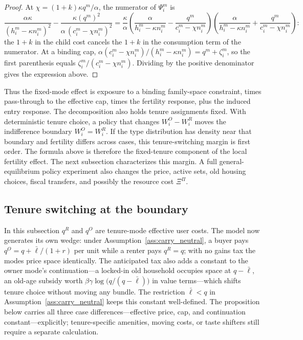 \documentclass[11pt]{article}
\newcommand{\1}{\mathbf 1}
\begin{document}
\begin{proof}
At $\chi=(1+k)\kappa q^m/\alpha$, the numerator of $\Psi_i^m$ is
\[
\frac{\alpha\kappa}{(h_i^m-\kappa n_i^m)^2}
-
\frac{\kappa (q^m)^2}{\alpha\,(c_i^m-\chi n_i^m)^2}
=
\frac{\kappa}{\alpha}
\left(\frac{\alpha}{h_i^m-\kappa n_i^m}-\frac{q^m}{c_i^m-\chi n_i^m}\right)
\left(\frac{\alpha}{h_i^m-\kappa n_i^m}+\frac{q^m}{c_i^m-\chi n_i^m}\right):
\]
the $1+k$ in the child cost cancels the $1+k$ in the consumption term of the numerator. At a binding cap, $\alpha(c_i^m-\chi n_i^m)/(h_i^m-\kappa n_i^m)=q^m+\zeta_i^m$, so the first parenthesis equals $\zeta_i^m/(c_i^m-\chi n_i^m)$. Dividing by the positive denominator gives the expression above.
\end{proof}

Thus the fixed-mode effect is exposure to a binding family-space constraint, times pass-through to the effective cap, times the fertility response, plus the induced entry response. The decomposition also holds tenure assignments fixed. With deterministic tenure choice, a policy that changes $W_i^O-W_i^R$ moves the indifference boundary $W_i^O=W_i^R$. If the type distribution has density near that boundary and fertility differs across cases, this tenure-switching margin is first order. The formula above is therefore the fixed-tenure component of the local fertility effect. The next subsection characterizes this margin. A full general-equilibrium policy experiment also changes the price, active sets, old housing choices, fiscal transfers, and possibly the resource cost $\Xi^\Pi$.

\subsection{Tenure switching at the boundary}

In this subsection $q^R$ and $q^O$ are tenure-mode effective user costs. The model now generates its own wedge: under Assumption~\ref{ass:carry_neutral}, a buyer pays $q^O=q+\bar\ell/(1+r)$ per unit while a renter pays $q^R=q$; with no gains tax the modes price space identically. The anticipated tax also adds a constant to the owner mode's continuation---a locked-in old household occupies space at $q-\bar\ell$, an old-age subsidy worth $\beta\gamma\log\big(q/(q-\bar\ell)\big)$ in value terms---which shifts tenure choice without moving any bundle. The restriction $\bar\ell<q$ in Assumption~\ref{ass:carry_neutral} keeps this constant well-defined. The proposition below carries all three case differences---effective price, cap, and continuation constant---explicitly; tenure-specific amenities, moving costs, or taste shifters still require a separate calculation.
\end{document}
